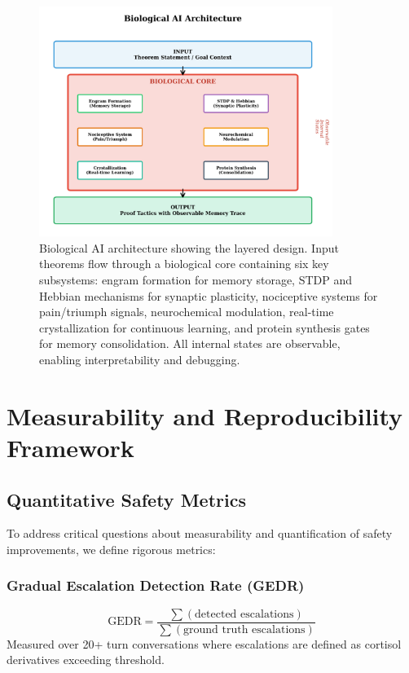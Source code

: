 \documentclass[12pt]{article}
\begin{document}
\begin{figure}[h]
\centering
\includegraphics[width=0.85\textwidth]{figure2_biological_architecture.png}
\caption{Biological AI architecture showing the layered design. Input theorems flow through a biological core containing six key subsystems: engram formation for memory storage, STDP and Hebbian mechanisms for synaptic plasticity, nociceptive systems for pain/triumph signals, neurochemical modulation, real-time crystallization for continuous learning, and protein synthesis gates for memory consolidation. All internal states are observable, enabling interpretability and debugging.}
\label{fig:architecture}
\end{figure}

\section{Measurability and Reproducibility Framework}

\subsection{Quantitative Safety Metrics}

To address critical questions about measurability and quantification of safety improvements, we define rigorous metrics:

\subsubsection{Gradual Escalation Detection Rate (GEDR)}
\begin{equation}
\text{GEDR} = \frac{\sum(\text{detected escalations})}{\sum(\text{ground truth escalations})}
\end{equation}
Measured over 20+ turn conversations where escalations are defined as cortisol derivatives exceeding threshold.
\end{document}
